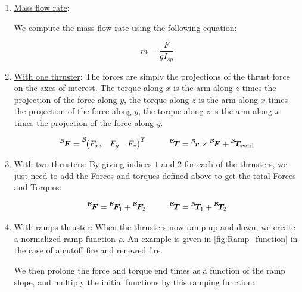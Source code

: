 \begin{enumerate}

	\item{\underline{Mass flow rate}}:

	We compute the mass flow rate using the following equation:

	\begin{equation}
	\dot{m} = \frac{F}{g I_{sp}}
	\end{equation}

	\item{\underline{With one thruster}}: The forces are simply the projections of the thrust force on the axes of interest. The torque along $x$ is the arm along $z$ times the projection of the force along $y$, the torque along $z$ is the arm along $x$ times the projection of the force along $y$, the torque along $z$ is the arm along $x$ times the projection of the force along $y$.

	\begin{align}
		\leftexp{B}{\bm F} =\leftexp{B}{\begin{pmatrix} F_x, & F_y & F_z \end{pmatrix}}^T&\hspace{1cm} \leftexp{B}{\bm T} =\leftexp{B}{\bm r} \times \leftexp{B}{\bm F} +  \leftexp{B}{\bm T}_{\mathrm{swirl}}\\
	\end{align}


	\item{\underline{With two thrusters}}: By giving indices $1$ and $2$ for each of the thrusters, we just need to add the Forces and torques defined above to get the total Forces and Torques:

	\begin{align}
		\leftexp{B}{\bm F} = \leftexp{B}{\bm F_1}  + \leftexp{B}{\bm F_2} &\hspace{1cm} \leftexp{B}{\bm T} = \leftexp{B}{\bm T_1}  + \leftexp{B}{\bm T_2} \\
	\end{align}

	\item{\underline{With ramps thruster}}: When the thrusters now ramp up and down, we create a normalized ramp function $\rho$. An example is given in \ref{fig:Ramp_function} in the case of a cutoff fire and renewed fire. \par

	

	We then prolong the force and torque end times as a function of the ramp slope, and multiply the initial functions by this ramping function:


\end{enumerate}
